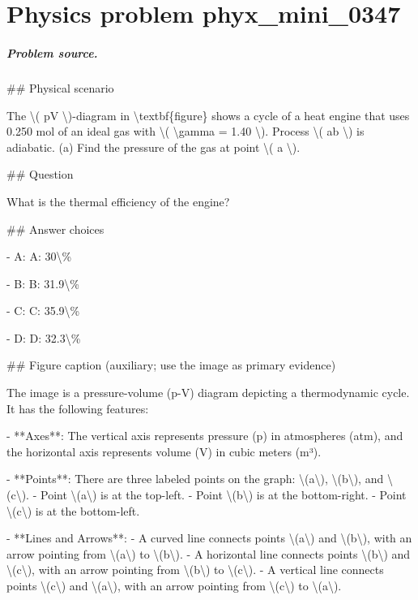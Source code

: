 
\chapter{Physics problem phyx\_mini\_0347}
\label{ch:PhyXMiniProblems_problem_phyx_mini_0347}

\paragraph{Problem source.}
\#\# Physical scenario

The \textbackslash{}( pV \textbackslash{})-diagram in \textbackslash{}textbf\{figure\} shows a cycle of a heat engine that uses 0.250 mol of an ideal gas with \textbackslash{}( \textbackslash{}gamma = 1.40 \textbackslash{}). Process \textbackslash{}( ab \textbackslash{}) is adiabatic. (a) Find the pressure of the gas at point \textbackslash{}( a \textbackslash{}).

\#\# Question

What is the thermal efficiency of the engine?

\#\# Answer choices

- A: A: 30\textbackslash{}\%

- B: B: 31.9\textbackslash{}\%

- C: C: 35.9\textbackslash{}\%

- D: D: 32.3\textbackslash{}\%

\#\# Figure caption (auxiliary; use the image as primary evidence)

The image is a pressure-volume (p-V) diagram depicting a thermodynamic cycle. It has the following features:

- **Axes**: The vertical axis represents pressure (p) in atmospheres (atm), and the horizontal axis represents volume (V) in cubic meters (m³).

- **Points**: There are three labeled points on the graph: \textbackslash{}(a\textbackslash{}), \textbackslash{}(b\textbackslash{}), and \textbackslash{}(c\textbackslash{}).
  - Point \textbackslash{}(a\textbackslash{}) is at the top-left.
  - Point \textbackslash{}(b\textbackslash{}) is at the bottom-right.
  - Point \textbackslash{}(c\textbackslash{}) is at the bottom-left.

- **Lines and Arrows**:
  - A curved line connects points \textbackslash{}(a\textbackslash{}) and \textbackslash{}(b\textbackslash{}), with an arrow pointing from \textbackslash{}(a\textbackslash{}) to \textbackslash{}(b\textbackslash{}).
  - A horizontal line connects points \textbackslash{}(b\textbackslash{}) and \textbackslash{}(c\textbackslash{}), with an arrow pointing from \textbackslash{}(b\textbackslash{}) to \textbackslash{}(c\textbackslash{}).
  - A vertical line connects points \textbackslash{}(c\textbackslash{}) and \textbackslash{}(a\textbackslash{}), with an arrow pointing from \textbackslash{}(c\textbackslash{}) to \textbackslash{}(a\textbackslash{}).

